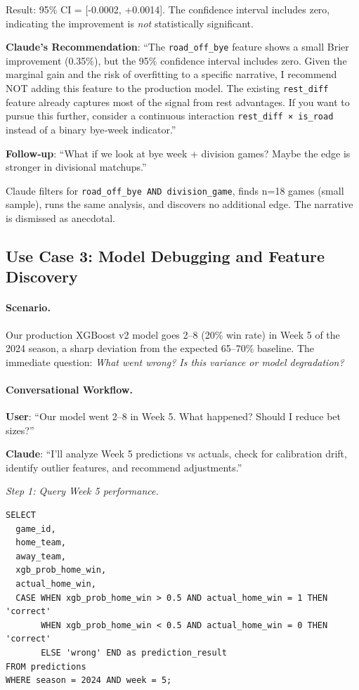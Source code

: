 Result: 95\% CI = [-0.0002, +0.0014]. The confidence interval includes zero, indicating the improvement is \textit{not} statistically significant.

\textbf{Claude's Recommendation}: ``The \texttt{road\_off\_bye} feature shows a small Brier improvement (0.35\%), but the 95\% confidence interval includes zero. Given the marginal gain and the risk of overfitting to a specific narrative, I recommend NOT adding this feature to the production model. The existing \texttt{rest\_diff} feature already captures most of the signal from rest advantages. If you want to pursue this further, consider a continuous interaction \texttt{rest\_diff × is\_road} instead of a binary bye‑week indicator.''

\textbf{Follow‑up}: ``What if we look at bye week + division games? Maybe the edge is stronger in divisional matchups.''

Claude filters for \texttt{road\_off\_bye AND division\_game}, finds n=18 games (small sample), runs the same analysis, and discovers no additional edge. The narrative is dismissed as anecdotal.

\subsection{Use Case 3: Model Debugging and Feature Discovery}
\label{subsec:use_case_debugging}

\paragraph{Scenario.}
Our production XGBoost v2 model goes 2--8 (20\% win rate) in Week 5 of the 2024 season, a sharp deviation from the expected 65--70\% baseline. The immediate question: \textit{What went wrong? Is this variance or model degradation?}

\paragraph{Conversational Workflow.}
\textbf{User}: ``Our model went 2--8 in Week 5. What happened? Should I reduce bet sizes?''

\textbf{Claude}: ``I'll analyze Week 5 predictions vs actuals, check for calibration drift, identify outlier features, and recommend adjustments.''

\textit{Step 1: Query Week 5 performance.}
\begin{verbatim}
SELECT
  game_id,
  home_team,
  away_team,
  xgb_prob_home_win,
  actual_home_win,
  CASE WHEN xgb_prob_home_win > 0.5 AND actual_home_win = 1 THEN 'correct'
       WHEN xgb_prob_home_win < 0.5 AND actual_home_win = 0 THEN 'correct'
       ELSE 'wrong' END as prediction_result
FROM predictions
WHERE season = 2024 AND week = 5;
\end{verbatim}

